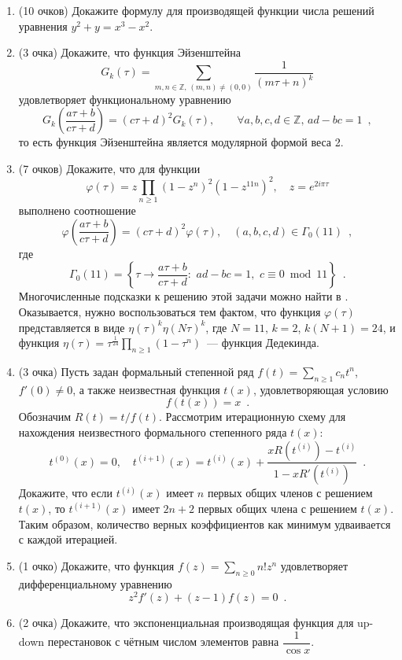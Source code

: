 \documentclass{article}
\theoremstyle{definition}
\begin{document}
\begin{enumerate}
\item(10 очков) Докажите формулу для производящей функции числа решений уравнения \( y^2 + y = x^3 - x^2 \).

\item(3 очка) Докажите, что функция Эйзенштейна
\[
	G_k(\tau) = \sum_{m,n\in \mathbb Z, \, (m,n) \neq (0,0)} \dfrac{1}{(m \tau + n)^k}
\]
удовлетворяет функциональному уравнению
\[
	G_k\left( \dfrac{a \tau + b}{c \tau + d}\right) = (c \tau + d)^2 G_k(\tau), \qquad \forall a,b,c,d \in \mathbb Z, \, ad - bc = 1 \enspace ,
\]
то есть функция Эйзенштейна является модулярной формой веса 2.

\item(7 очков) Докажите, что
для функции
\[
    \varphi(\tau) = z \prod_{n \geq 1}(1 - z^n)^2 (1 - z^{11n})^2, \quad z =
e^{2 i \pi \tau}
\]
выполнено соотношение
\[
	\varphi \left(\dfrac{a \tau + b}{c \tau + d}\right) = (c \tau + d)^{2} \varphi (\tau), \quad
	(a,b,c,d) \in \Gamma_0(11) \enspace ,
\]
где
\[
    \Gamma_0(11) = \left\{
    \tau \to \dfrac{a \tau + b}{c \tau + d} \colon \,\, ad - bc = 1,\,\, c
\equiv 0 \bmod 11
\right\} \enspace .
\]
Многочисленные подсказки к решению этой задачи можно найти в
\cite[Proposition 3.2.2]{first_course_modular_forms}. Оказывается, нужно
воспользоваться тем фактом, что функция \( \varphi(\tau) \) представляется в
виде \( \eta(\tau)^k \eta(N \tau)^k  \), где \( N = 11, \, k = 2 \), \( k(N+1) =
24 \), и функция \( \eta(\tau) = \tau^{\frac{1}{24}} \prod_{n \geq 1}(1 -
\tau^n) \)~--- функция Дедекинда.

\item(3 очка) Пусть задан формальный степенной ряд \( f(t) = \sum_{n \geq 1} c_n t^n \), \( f'(0) \neq 0 \), а также неизвестная функция \( t(x) \), удовлетворяющая условию
\[
	f(t(x)) = x \enspace .
\]
Обозначим \( R(t) = t / f(t) \).
Рассмотрим итерационную схему для нахождения неизвестного формального степенного ряда \( t(x) \):
\[
	t^{(0)}(x) = 0, \quad
	t^{(i+1)}(x) = t^{(i)}(x) + \dfrac{x R(t^{(i)}) - t^{(i)}}{1 - x R'(t^{(i)})} \enspace .
\]
Докажите, что если \( t^{(i)}(x) \) имеет \( n \) первых общих членов с решением \( t(x) \), то \( t^{(i+1)}(x) \) имеет \( 2n + 2 \) первых общих члена с решением \( t(x) \). Таким образом, количество верных коэффициентов как минимум удваивается с каждой итерацией.

\item(1 очко) Докажите, что функция \( f(z) = \sum_{n \geq 0} n! z^n \)
удовлетворяет дифференциальному уравнению 
\[
    z^2 f'(z) + (z-1) f(z) = 0 \enspace .
\]
\item(2 очка) Докажите, что экспоненциальная производящая функция для up-down перестановок с чётным числом элементов равна \( \dfrac{1}{\cos x} \).
\end{enumerate}

\footnotesize


    
\end{document}
